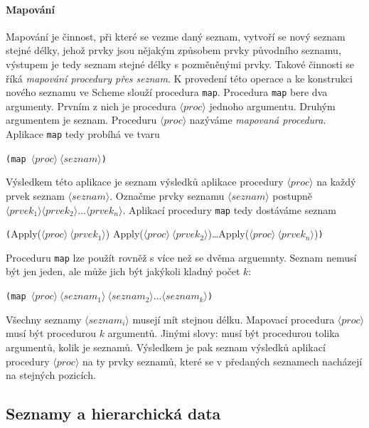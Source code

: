 \documentclass[10pt,a4paper]{article}
\begin{document}
    \paragraph{Mapování} Mapování je činnost, při které se vezme daný seznam, vytvoří se nový seznam stejné délky, jehož prvky jsou nějakým způsobem  prvky původního seznamu, výstupem je tedy seznam stejné délky s pozměněnými prvky. Takové činnosti se říká \textit{mapování procedury přes seznam}. K provedení této operace a ke konstrukci nového seznamu ve Scheme slouží procedura \texttt{map}. Procedura \texttt{map} bere dva argumenty. Prvním z nich je procedura $\langle proc \rangle$ jednoho argumentu. Druhým argumentem je seznam. Proceduru $\langle proc \rangle$ nazýváme \textit{mapovaná procedura}. Aplikace \texttt{map} tedy probíhá ve tvaru
    
    \hspace{4ex} \texttt{(map $\langle proc \rangle\ \langle seznam \rangle$)}
    
    Výsledkem této aplikace je seznam výsledků aplikace procedury $\langle proc \rangle$ na každý prvek seznam $\langle seznam \rangle$. Označme prvky seznamu $\langle seznam \rangle$ postupně $\langle prvek_1 \rangle \langle prvek_2 \rangle \ldots \langle prvek_n \rangle $. Aplikací procedury \texttt{map} tedy dostáváme seznam
    
    \hspace{4ex}\texttt{(}Apply($\langle proc \rangle\ \langle prvek_1 \rangle$) Apply($\langle proc \rangle\ \langle prvek_2 \rangle$)\ldots Apply($\langle proc \rangle\ \langle prvek_n \rangle$)\texttt{)}
    
    Proceduru \texttt{map} lze použít rovněž s více než se dvěma arguemnty. Seznam nemusí být jen jeden, ale může jich být jakýkoli kladný počet $k$:
    
    \hspace{4ex} \texttt{(map $\langle proc \rangle\ \langle seznam_1 \rangle\ \langle seznam_2 \rangle\ldots\langle seznam_k \rangle$)}
    
    Všechny seznamy $\langle seznam_i \rangle$ musejí mít stejnou délku. Mapovací procedura $\langle proc \rangle$ musí být procedurou $k$ argumentů. Jinými slovy: musí být procedurou tolika argumentů, kolik je seznamů. Výsledkem je pak seznam výsledků aplikací procedury $\langle proc \rangle$ na ty prvky seznamů, které se v předaných seznamech nacházejí na stejných pozicích.
  \subsection{Seznamy a hierarchická data}
\end{document}
